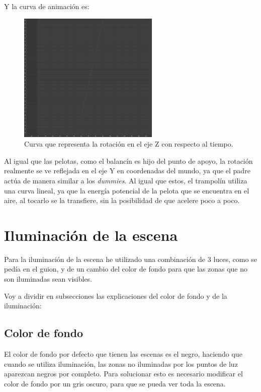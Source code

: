 \documentclass{article}
\begin{document}
\bigskip

Y la curva de animación es:

\begin{figure}[H]
    \centering
    \includegraphics[width=0.6\textwidth]{imagenes/curvas/Trampolin/blue.png}
    \caption{Curva que representa la rotación en el eje Z con respecto al tiempo.}
 \end{figure}

 Al igual que las pelotas, como el balancín es hijo del punto de apoyo, la rotación realmente se ve reflejada en el eje Y en coordenadas del mundo, ya que el padre actúa de manera similar a los \textit{dummies}. Al igual que estos, el trampolín utiliza una curva lineal, ya que la energía potencial de la pelota que se encuentra en el aire, al tocarlo se la transfiere, sin la posibilidad de que acelere poco a poco.

 \newpage
\section{Iluminación de la escena}
Para la iluminación de la escena he utilizado una combinación de 3 luces, como se pedía en el guion, y de un cambio del color de fondo para que las zonas que no son iluminadas sean visibles.

\bigskip

Voy a dividir en subsecciones las explicaciones del color de fondo y de la iluminación:

\subsection{Color de fondo}

El color de fondo por defecto que tienen las escenas es el negro, haciendo que cuando se utiliza iluminación, las zonas no iluminadas por los puntos de luz aparezcan negros por completo. Para solucionar esto es necesario modificar el color de fondo por un gris oscuro, para que se pueda ver toda la escena.
\end{document}
